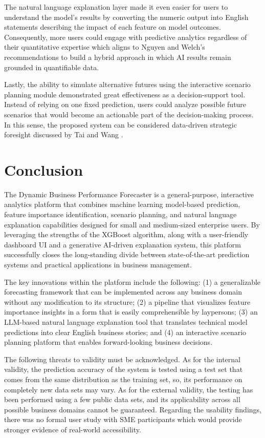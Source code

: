 \documentclass[12pt]{article}
\begin{document}
The natural language explanation layer made it even easier for users to understand
the model's results by converting the numeric output into English statements describing
the impact of each feature on model outcomes. Consequently, more users could engage
with predictive analytics regardless of their quantitative expertise which aligns to Nguyen and Welch’s \cite{doi:10.1177/10944281251377154} recommendations to build a hybrid approach in which AI results remain grounded in quantifiable data.

Lastly, the ability to simulate alternative futures using the interactive scenario planning
module demonstrated great effectiveness as a decision-support tool. Instead of relying on
one fixed prediction, users could analyze possible future scenarios that would become
an actionable part of the decision-making process. In this sense, the proposed system can
be considered data-driven strategic foresight discussed by Tai and Wang \cite{10.1145/3624875.3624885}.


\section{Conclusion}
The Dynamic Business Performance Forecaster is a general-purpose, interactive analytics platform that combines machine learning model-based prediction, feature importance identification,
scenario planning, and natural language explanation capabilities designed for small and medium-sized enterprise users. By leveraging the strengths of the XGBoost algorithm, along with a user-friendly dashboard UI and a generative AI-driven explanation system, this platform successfully closes the long-standing divide between state-of-the-art prediction systems and practical applications in business management.

The key innovations within the platform include the following: (1) a generalizable forecasting framework that can be implemented across any business domain without any modification to its structure; (2) a pipeline that visualizes feature importance insights in a form that is easily comprehensible by laypersons; (3) an LLM-based natural language explanation tool that translates technical model predictions into clear English business stories; and (4) an interactive scenario planning platform that enables forward-looking business decisions.

The following threats to validity must be acknowledged. As for the internal validity, the prediction accuracy of the system is tested using a test  set that comes from the same distribution as the training set, so, its performance on completely new data sets may vary. As for the external validity, the testing has been performed
using a few public data sets, and its applicability across all possible business domains cannot be guaranteed. Regarding the usability findings, there was no formal user study with SME participants which would provide stronger evidence of real-world accessibility.
\end{document}
